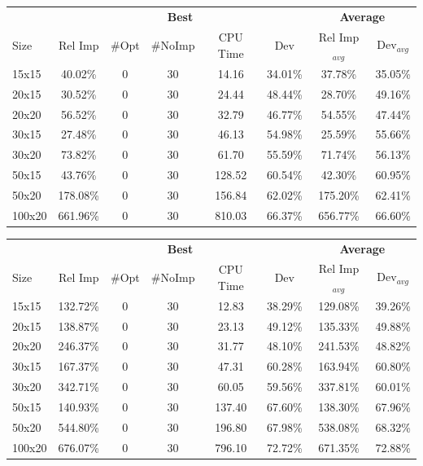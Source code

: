 \documentclass{mimosis}
\begin{document}
\begin{table}[h]
\begin{tabular}{lccccc|cc}
\multicolumn{1}{c}{} & \multicolumn{5}{c}{\textbf{Best}} & \multicolumn{2}{c}{\textbf{Average}} \\
\cmidrule(lr){2-6}\cmidrule(lr){7-8}
Size & Rel Imp & \#Opt & \#NoImp & CPU Time & Dev & Rel Imp$_{avg}$ & Dev$_{avg}$ \\
\hline
15x15 & 40.02\% & 0 & 30 & 14.16 & 34.01\% & 37.78\% & 35.05\% \\
20x15 & 30.52\% & 0 & 30 & 24.44 & 48.44\% & 28.70\% & 49.16\% \\
20x20 & 56.52\% & 0 & 30 & 32.79 & 46.77\% & 54.55\% & 47.44\% \\
30x15 & 27.48\% & 0 & 30 & 46.13 & 54.98\% & 25.59\% & 55.66\% \\
30x20 & 73.82\% & 0 & 30 & 61.70 & 55.59\% & 71.74\% & 56.13\% \\
50x15 & 43.76\% & 0 & 30 & 128.52 & 60.54\% & 42.30\% & 60.95\% \\
50x20 & 178.08\% & 0 & 30 & 156.84 & 62.02\% & 175.20\% & 62.41\% \\
100x20 & 661.96\% & 0 & 30 & 810.03 & 66.37\% & 656.77\% & 66.60\% \\
\end{tabular}
\label{tab:gen_results_prob02}
\end{table}

\begin{table}[h]
\begin{tabular}{lccccc|cc}
\multicolumn{1}{c}{} & \multicolumn{5}{c}{\textbf{Best}} & \multicolumn{2}{c}{\textbf{Average}} \\
\cmidrule(lr){2-6}\cmidrule(lr){7-8}
Size & Rel Imp & \#Opt & \#NoImp & CPU Time & Dev & Rel Imp$_{avg}$ & Dev$_{avg}$ \\
\hline
15x15 & 132.72\% & 0 & 30 & 12.83 & 38.29\% & 129.08\% & 39.26\% \\
20x15 & 138.87\% & 0 & 30 & 23.13 & 49.12\% & 135.33\% & 49.88\% \\
20x20 & 246.37\% & 0 & 30 & 31.77 & 48.10\% & 241.53\% & 48.82\% \\
30x15 & 167.37\% & 0 & 30 & 47.31 & 60.28\% & 163.94\% & 60.80\% \\
30x20 & 342.71\% & 0 & 30 & 60.05 & 59.56\% & 337.81\% & 60.01\% \\
50x15 & 140.93\% & 0 & 30 & 137.40 & 67.60\% & 138.30\% & 67.96\% \\
50x20 & 544.80\% & 0 & 30 & 196.80 & 67.98\% & 538.08\% & 68.32\% \\
100x20 & 676.07\% & 0 & 30 & 796.10 & 72.72\% & 671.35\% & 72.88\% \\
\end{tabular}
\label{tab:gen_results_prob05}
\end{table}
\end{document}
